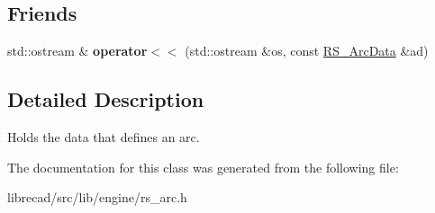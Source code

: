\subsection*{Friends}
\begin{DoxyCompactItemize}
\item 
\hypertarget{classRS__ArcData_a96b23d991a82947ad26b6a95a6ff8b79}{std\-::ostream \& {\bfseries operator$<$$<$} (std\-::ostream \&os, const \hyperlink{classRS__ArcData}{R\-S\-\_\-\-Arc\-Data} \&ad)}\label{classRS__ArcData_a96b23d991a82947ad26b6a95a6ff8b79}

\end{DoxyCompactItemize}


\subsection{Detailed Description}
Holds the data that defines an arc. 

The documentation for this class was generated from the following file\-:\begin{DoxyCompactItemize}
\item 
librecad/src/lib/engine/rs\-\_\-arc.\-h\end{DoxyCompactItemize}
